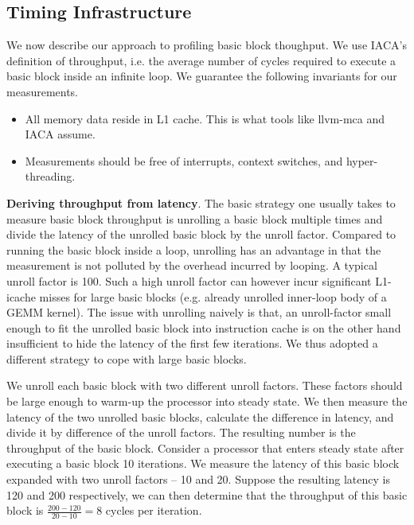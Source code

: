 \subsection{Timing Infrastructure}
We now describe our approach to profiling basic block thoughput.
We use IACA's definition of throughput, i.e. 
the average number of cycles required to execute a basic block inside
an infinite loop.
We guarantee the following invariants for our measurements.
\begin{itemize}
\item All memory data reside in L1 cache.
This is what tools like llvm-mca and IACA assume.

\item Measurements should be free of interrupts, context switches,
and hyper-threading.
\end{itemize}

\textbf{Deriving throughput from latency}.
The basic strategy one usually takes to measure basic block throughput
is unrolling a basic block multiple times and divide the latency of the
unrolled basic block by the unroll factor.
Compared to running the basic block inside a loop,
unrolling has an advantage in that the measurement is not polluted by
the overhead incurred by looping.
A typical unroll factor is 100\cite{ithemal,uops}.
Such a high unroll factor can however incur significant
L1-icache misses for large basic blocks
(e.g. already unrolled inner-loop body of a GEMM kernel).
The issue with unrolling naively is that,
an unroll-factor small enough to fit the 
unrolled basic block into instruction cache is on the other hand
insufficient to hide the latency of the first few iterations.
We thus adopted a different strategy to cope with large basic blocks.

We unroll each basic block with two different unroll factors.
These factors should be large enough 
to warm-up the processor into steady state.
We then measure the latency of the two unrolled basic blocks,
calculate the difference in latency, and divide it 
by difference of the unroll factors.
The resulting number is the throughput of the basic block.
Consider a processor that enters steady state
after executing a basic block 10 iterations.
We measure the latency of this basic block expanded with
two unroll factors -- 10 and 20.
Suppose the resulting latency is 120 and 200 respectively,
we can then determine that the throughput of this basic block
is $\frac{200-120}{20-10} = 8$ cycles per iteration.

